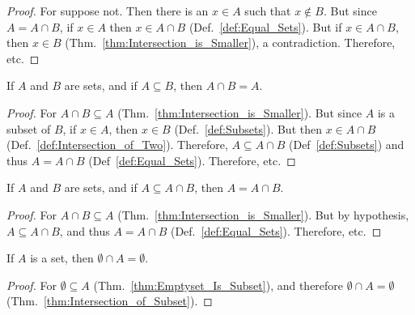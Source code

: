             \begin{proof}
                For suppose not. Then there is an $x\in{A}$ such
                that $x\notin{B}$. But since $A=A\cap{B}$,
                if $x\in{A}$ then $x\in{A}\cap{B}$
                (Def.~\ref{def:Equal_Sets}). But if
                $x\in{A}\cap{B}$, then $x\in{B}$
                (Thm.~\ref{thm:Intersection_is_Smaller}),
                a contradiction. Therefore, etc.
            \end{proof}
            \begin{theorem}
                \label{thm:Intersection_of_Subset}%
                If $A$ and $B$ are sets, and if
                $A\subseteq{B}$, then $A\cap{B}=A$.
            \end{theorem}
            \begin{proof}
                For $A\cap{B}\subseteq{A}$
                (Thm.~\ref{thm:Intersection_is_Smaller}). But
                since $A$ is a subset of $B$, if $x\in{A}$, then
                $x\in{B}$ (Def.~\ref{def:Subsets}). But then
                $x\in{A}\cap{B}$
                (Def.~\ref{def:Intersection_of_Two}). Therefore,
                $A\subseteq{A}\cap{B}$ (Def~\ref{def:Subsets})
                and thus $A=A\cap{B}$ (Def~\ref{def:Equal_Sets}).
                Therefore, etc.
            \end{proof}
            \begin{theorem}
                \label{thm:Conv_Intersection_is_Smaller}%
                If $A$ and $B$ are sets, and if
                $A\subseteq{A}\cap{B}$, then $A=A\cap{B}$.
            \end{theorem}
            \begin{proof}
                For $A\cap{B}\subseteq{A}$
                (Thm.~\ref{thm:Intersection_is_Smaller}). But
                by hypothesis, $A\subseteq{A}\cap{B}$, and thus
                $A=A\cap{B}$ (Def.~\ref{def:Equal_Sets}).
                Therefore, etc.
            \end{proof}
            \begin{theorem}
                If $A$ is a set, then
                $\emptyset\cap{A}=\emptyset$.
            \end{theorem}
            \begin{proof}
                For $\emptyset\subseteq{A}$
                (Thm.~\ref{thm:Emptyset_Is_Subset}), and
                therefore $\emptyset\cap{A}=\emptyset$
                (Thm.~\ref{thm:Intersection_of_Subset}).
            \end{proof}
